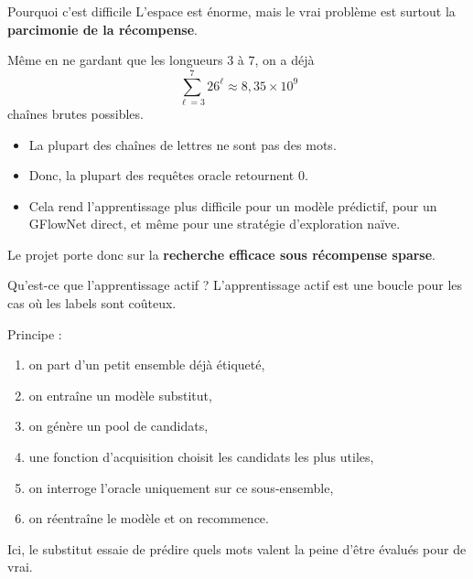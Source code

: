 \documentclass[aspectratio=169,10pt]{beamer}
\begin{document}
\begin{frame}{Pourquoi c'est difficile}
\justifying
L'espace est énorme, mais le vrai problème est surtout la
\textbf{parcimonie de la récompense}.

\vspace{0.4em}
Même en ne gardant que les longueurs \(3\) à \(7\), on a déjà
\[
\sum_{\ell=3}^{7} 26^\ell \approx 8{,}35\times 10^9
\]
chaînes brutes possibles.

\begin{itemize}
  \item La plupart des chaînes de lettres ne sont pas des mots.
  \item Donc, la plupart des requêtes oracle retournent \(0\).
  \item Cela rend l'apprentissage plus difficile pour un modèle prédictif,
  pour un GFlowNet direct, et même pour une stratégie d'exploration naïve.
\end{itemize}

\vspace{0.5em}
Le projet porte donc sur la \textbf{recherche efficace sous récompense sparse}.
\end{frame}

\begin{frame}{Qu'est-ce que l'apprentissage actif ?}
\justifying
L'apprentissage actif est une boucle pour les cas où les labels sont coûteux.

\vspace{0.5em}
Principe :
\begin{enumerate}
  \item on part d'un petit ensemble déjà étiqueté,
  \item on entraîne un modèle substitut,
  \item on génère un pool de candidats,
  \item une fonction d'acquisition choisit les candidats les plus utiles,
  \item on interroge l'oracle uniquement sur ce sous-ensemble,
  \item on réentraîne le modèle et on recommence.
\end{enumerate}

\vspace{0.5em}
Ici, le substitut essaie de prédire quels mots valent la peine d'être évalués
pour de vrai.
\end{frame}
\end{document}
